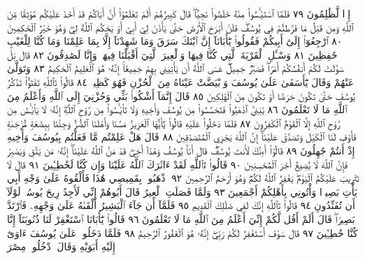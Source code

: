إِذࣰا لَّظَٰلِمُونَ ٧٩ فَلَمَّا ٱسْتَيْـَٔسُوا۟ مِنْهُ خَلَصُوا۟ نَجِيࣰّاۖ
قَالَ كَبِيرُهُمْ أَلَمْ تَعْلَمُوٓا۟ أَنَّ أَبَاكُمْ قَدْ أَخَذَ عَلَيْكُم
مَّوْثِقࣰا مِّنَ ٱللَّهِ وَمِن قَبْلُ مَا فَرَّطتُمْ فِي يُوسُفَۖ فَلَنْ أَبْرَحَ
ٱلْأَرْضَ حَتَّىٰ يَأْذَنَ لِيٓ أَبِيٓ أَوْ يَحْكُمَ ٱللَّهُ لِيۖ وَهُوَ خَيْرُ ٱلْحَٰكِمِينَ ٨٠
ٱرْجِعُوٓا۟ إِلَىٰٓ أَبِيكُمْ فَقُولُوا۟ يَٰٓأَبَانَآ إِنَّ ٱبْنَكَ سَرَقَ
وَمَا شَهِدْنَآ إِلَّا بِمَا عَلِمْنَا وَمَا كُنَّا لِلْغَيْبِ حَٰفِظِينَ ٨١
وَسْـَٔلِ ٱلْقَرْيَةَ ٱلَّتِي كُنَّا فِيهَا وَٱلْعِيرَ ٱلَّتِيٓ أَقْبَلْنَا فِيهَاۖ
وَإِنَّا لَصَٰدِقُونَ ٨٢ قَالَ بَلْ سَوَّلَتْ لَكُمْ أَنفُسُكُمْ أَمْرࣰاۖ
فَصَبْرࣱ جَمِيلٌۖ عَسَى ٱللَّهُ أَن يَأْتِيَنِي بِهِمْ جَمِيعًاۚ إِنَّهُۥ هُوَ
ٱلْعَلِيمُ ٱلْحَكِيمُ ٨٣ وَتَوَلَّىٰ عَنْهُمْ وَقَالَ يَٰٓأَسَفَىٰ عَلَىٰ
يُوسُفَ وَٱبْيَضَّتْ عَيْنَاهُ مِنَ ٱلْحُزْنِ فَهُوَ كَظِيمࣱ ٨٤
قَالُوا۟ تَٱللَّهِ تَفْتَؤُا۟ تَذْكُرُ يُوسُفَ حَتَّىٰ تَكُونَ حَرَضًا
أَوْ تَكُونَ مِنَ ٱلْهَٰلِكِينَ ٨٥ قَالَ إِنَّمَآ أَشْكُوا۟ بَثِّي
وَحُزْنِيٓ إِلَى ٱللَّهِ وَأَعْلَمُ مِنَ ٱللَّهِ مَا لَا تَعْلَمُونَ ٨٦
يَٰبَنِيَّ ٱذْهَبُوا۟ فَتَحَسَّسُوا۟ مِن يُوسُفَ وَأَخِيهِ وَلَا تَا۟يْـَٔسُوا۟
مِن رَّوْحِ ٱللَّهِۖ إِنَّهُۥ لَا يَا۟يْـَٔسُ مِن رَّوْحِ ٱللَّهِ إِلَّا ٱلْقَوْمُ
ٱلْكَٰفِرُونَ ٨٧ فَلَمَّا دَخَلُوا۟ عَلَيْهِ قَالُوا۟ يَٰٓأَيُّهَا ٱلْعَزِيزُ
مَسَّنَا وَأَهْلَنَا ٱلضُّرُّ وَجِئْنَا بِبِضَٰعَةࣲ مُّزْجَىٰةࣲ فَأَوْفِ لَنَا
ٱلْكَيْلَ وَتَصَدَّقْ عَلَيْنَآۖ إِنَّ ٱللَّهَ يَجْزِي ٱلْمُتَصَدِّقِينَ ٨٨
قَالَ هَلْ عَلِمْتُم مَّا فَعَلْتُم بِيُوسُفَ وَأَخِيهِ إِذْ أَنتُمْ
جَٰهِلُونَ ٨٩ قَالُوٓا۟ أَءِنَّكَ لَأَنتَ يُوسُفُۖ قَالَ أَنَا۠ يُوسُفُ
وَهَٰذَآ أَخِيۖ قَدْ مَنَّ ٱللَّهُ عَلَيْنَآۖ إِنَّهُۥ مَن يَتَّقِ وَيَصْبِرْ فَإِنَّ
ٱللَّهَ لَا يُضِيعُ أَجْرَ ٱلْمُحْسِنِينَ ٩٠ قَالُوا۟ تَٱللَّهِ لَقَدْ
ءَاثَرَكَ ٱللَّهُ عَلَيْنَا وَإِن كُنَّا لَخَٰطِـِٔينَ ٩١ قَالَ لَا تَثْرِيبَ
عَلَيْكُمُ ٱلْيَوْمَۖ يَغْفِرُ ٱللَّهُ لَكُمْۖ وَهُوَ أَرْحَمُ ٱلرَّٰحِمِينَ ٩٢
ٱذْهَبُوا۟ بِقَمِيصِي هَٰذَا فَأَلْقُوهُ عَلَىٰ وَجْهِ أَبِي يَأْتِ
بَصِيرࣰا وَأْتُونِي بِأَهْلِكُمْ أَجْمَعِينَ ٩٣ وَلَمَّا فَصَلَتِ
ٱلْعِيرُ قَالَ أَبُوهُمْ إِنِّي لَأَجِدُ رِيحَ يُوسُفَۖ لَوْلَآ أَن
تُفَنِّدُونِ ٩٤ قَالُوا۟ تَٱللَّهِ إِنَّكَ لَفِي ضَلَٰلِكَ ٱلْقَدِيمِ ٩٥
فَلَمَّآ أَن جَآءَ ٱلْبَشِيرُ أَلْقَىٰهُ عَلَىٰ وَجْهِهِۦ فَٱرْتَدَّ بَصِيرࣰاۖ قَالَ
أَلَمْ أَقُل لَّكُمْ إِنِّيٓ أَعْلَمُ مِنَ ٱللَّهِ مَا لَا تَعْلَمُونَ ٩٦ قَالُوا۟
يَٰٓأَبَانَا ٱسْتَغْفِرْ لَنَا ذُنُوبَنَآ إِنَّا كُنَّا خَٰطِـِٔينَ ٩٧ قَالَ سَوْفَ
أَسْتَغْفِرُ لَكُمْ رَبِّيٓۖ إِنَّهُۥ هُوَ ٱلْغَفُورُ ٱلرَّحِيمُ ٩٨ فَلَمَّا
دَخَلُوا۟ عَلَىٰ يُوسُفَ ءَاوَىٰٓ إِلَيْهِ أَبَوَيْهِ وَقَالَ ٱدْخُلُوا۟ مِصْرَ
